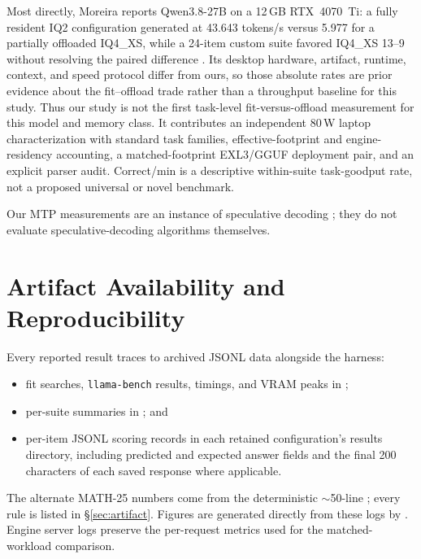\documentclass[11pt]{article}
\newcommand{\q}[1]{\texttt{#1}}
\begin{document}
Most directly, Moreira reports Qwen3.8-27B on a 12\,GB RTX~4070~Ti: a fully
resident IQ2 configuration generated at 43.643 tokens/s versus 5.977 for a
partially offloaded IQ4\_XS, while a 24-item custom suite favored IQ4\_XS
13--9 without resolving the paired difference \citep{moreira2026qwen38}.
Its desktop hardware, artifact, runtime, context, and speed protocol differ
from ours, so those absolute rates are prior evidence about the fit--offload
trade rather than a throughput baseline for this study.
Thus our study is not the first task-level fit-versus-offload measurement for
this model and memory class. It contributes an independent 80\,W laptop
characterization with standard task families, effective-footprint and
engine-residency accounting, a matched-footprint EXL3/GGUF deployment pair,
and an explicit parser audit. Correct/min is a descriptive within-suite
task-goodput rate, not a proposed universal or novel benchmark.

Our MTP measurements are an instance of speculative decoding
\citep{leviathan2022speculative,chen2023speculative}; they do not evaluate
speculative-decoding algorithms themselves.


\section{Artifact Availability and Reproducibility}
\label{sec:repro}

Every reported result traces to archived JSONL data alongside the harness:
\begin{itemize}
  \item fit searches, \q{llama-bench} results, timings, and VRAM peaks in
  ;
  \item per-suite summaries in
  ; and
  \item per-item JSONL scoring records in each retained configuration's
  results directory, including predicted and expected answer fields and the
  final 200 characters of each saved response where applicable.
\end{itemize}
The alternate MATH-25 numbers come from the deterministic $\sim$50-line
; every rule is listed in
\S\ref{sec:artifact}. Figures are generated directly from these logs by
. Engine server logs preserve the per-request
metrics used for the matched-workload comparison.
\end{document}
